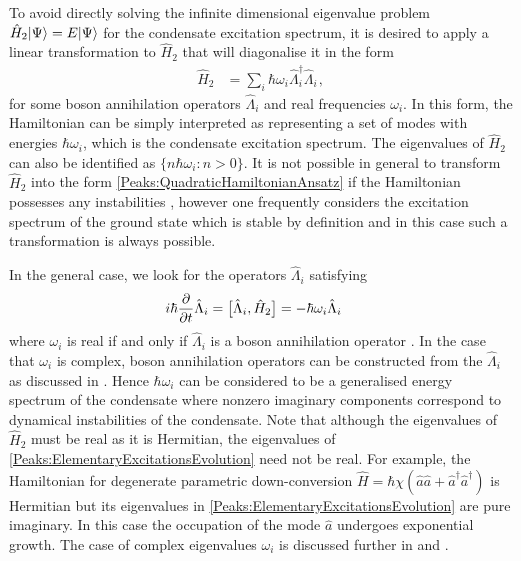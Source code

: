 To avoid directly solving the infinite dimensional eigenvalue problem $\hat{H}_2 {\left|\Psi\right>} = E {\left|\Psi\right>}$ for the condensate excitation spectrum, it is desired to apply a linear transformation to $\hat{H}_2$ that will diagonalise it in the form
\begin{align}
    \label{Peaks:QuadraticHamiltonianAnsatz}
    \hat{H}_2 &= \sum_i \hbar \omega_i \hat{\Lambda}_i^\dagger \hat{\Lambda}_i^{\phantom{\dagger}},
\end{align}
for some boson annihilation operators $\hat{\Lambda}_i$ and real frequencies $\omega_i$. In this form, the Hamiltonian can be simply interpreted as representing a set of modes with energies $\hbar \omega_i$, which is the condensate excitation spectrum. The eigenvalues of $\hat{H}_2$ can also be identified as $\{n \hbar \omega_i : n > 0 \}$. It is not possible in general to transform $\hat{H}_2$ into the form \eqref{Peaks:QuadraticHamiltonianAnsatz} if the Hamiltonian possesses any instabilities \citep{Leonhardt:2003}, however one frequently considers the excitation spectrum of the ground state which is stable by definition and in this case such a transformation is always possible.

In the general case, we look for the operators $\hat{\Lambda}_i$ satisfying
\begin{align}
    \label{Peaks:ElementaryExcitationsEvolution}
    i \hbar \frac{\partial }{\partial t}\hat{\Lambda}_i &= \comm{\hat{\Lambda}_i, \hat{H}_2 } = - \hbar \omega_i \hat{\Lambda}_i
\end{align}
where $\omega_i$ is real if and only if $\hat{\Lambda}_i$ is a boson annihilation operator \citep{Leonhardt:2003}. In the case that $\omega_i$ is complex, boson annihilation operators can be constructed from the $\hat{\Lambda}_i$ as discussed in . Hence $\hbar\omega_i$ can be considered to be a generalised energy spectrum of the condensate where nonzero imaginary components correspond to dynamical instabilities of the condensate. Note that although the eigenvalues of $\hat{H}_2$ must be real as it is Hermitian, the eigenvalues of \eqref{Peaks:ElementaryExcitationsEvolution} need not be real. For example, the Hamiltonian for degenerate parametric down-conversion $\hat{H} = \hbar\chi \left(\hat{a}\hat{a} + \hat{a}^\dagger \hat{a}^\dagger \right)$ is Hermitian but its eigenvalues in \eqref{Peaks:ElementaryExcitationsEvolution} are pure imaginary. In this case the occupation of the mode $\hat{a}$ undergoes exponential growth. The case of complex eigenvalues $\omega_i$ is discussed further in  and .

